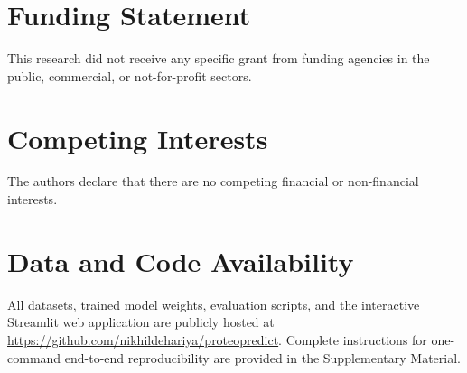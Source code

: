 \documentclass[twocolumn,10pt]{article}
\begin{document}
\section*{Funding Statement}
This research did not receive any specific grant from funding agencies in the public, commercial, or not-for-profit sectors.

\section*{Competing Interests}
The authors declare that there are no competing financial or non-financial interests.

\section*{Data and Code Availability}
All datasets, trained model weights, evaluation scripts, and the interactive Streamlit web application are publicly hosted at \url{https://github.com/nikhildehariya/proteopredict}. Complete instructions for one-command end-to-end reproducibility are provided in the Supplementary Material.

{\small


}
\end{document}
